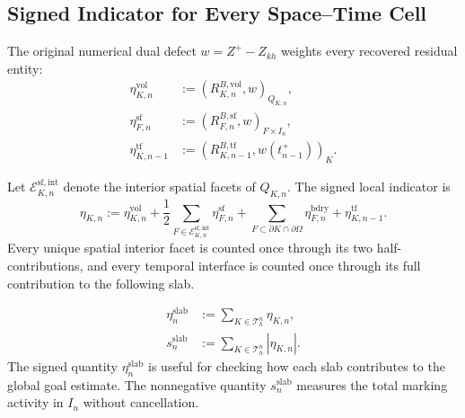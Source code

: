 \documentclass[11pt,a4paper]{article}
\begin{document}
\subsection{Signed Indicator for Every Space--Time Cell}
\label{sec:space-time-cell-indicators}

The original numerical dual defect \(w=Z^+-Z_{kh}\) weights every recovered residual entity:
\begin{align}
 \eta_{K,n}^{\mathrm{vol}}
 &:=
 (R_{K,n}^{B,\mathrm{vol}},w)_{Q_{K,n}},
 \label{eq:single-volume-contribution}\\
 \eta_{F,n}^{\mathrm{sf}}
 &:=
 (R_{F,n}^{B,\mathrm{sf}},w)_{F\times I_n},
 \label{eq:single-spatial-facet-contribution}\\
 \eta_{K,n-1}^{\mathrm{tf}}
 &:=
 (R_{K,n-1}^{B,\mathrm{tf}},w(t_{n-1}^{+}))_K .
 \label{eq:single-temporal-facet-contribution}
\end{align}


Let \(\mathcal E_{K,n}^{\mathrm{sf,int}}\) denote the interior spatial
facets of \(Q_{K,n}\). The signed local indicator is
\begin{equation}
 \boxed{
 \eta_{K,n}
 :=
 \eta_{K,n}^{\mathrm{vol}}
 +
 \frac12\sum_{F\in\mathcal E_{K,n}^{\mathrm{sf,int}}}
       \eta_{F,n}^{\mathrm{sf}}
 +
 \sum_{F\subset\partial K\cap\partial\Omega}
       \eta_{F,n}^{\mathrm{bdry}}
 +
 \eta_{K,n-1}^{\mathrm{tf}}.}
 \label{eq:single-space-time-cell-indicator}
\end{equation}
Every unique spatial interior facet is counted once through its two half-contributions, and every temporal interface is counted once through its full contribution to the following slab.

\begin{align}
 \eta_n^{\mathrm{slab}}
 &:=
 \sum_{K\in\mathcal T_h^n}\eta_{K,n},
 \label{eq:signed-slab-indicator}\\
 s_n^{\mathrm{slab}}
 &:=
 \sum_{K\in\mathcal T_h^n}|\eta_{K,n}|.
 \label{eq:absolute-slab-score}
\end{align}
The signed quantity \(\eta_n^{\mathrm{slab}}\) is useful for checking how each slab contributes to the global goal estimate. The nonnegative quantity \(s_n^{\mathrm{slab}}\) measures the total marking activity in \(I_n\) without cancellation.
\end{document}
